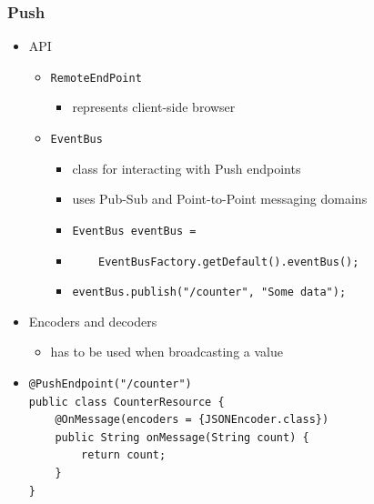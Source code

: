 \documentclass[10pt,xcolor=pdflatex]{beamer}
\begin{document}
\begin{frame}[containsverbatim]\frametitle{Push}
  \begin{itemize}
    \item API
      \begin{itemize}
        \item \texttt{RemoteEndPoint}
          \begin{itemize}
            \item represents client-side browser
          \end{itemize}
    	\item \texttt{EventBus}
          \begin{itemize}
            \item class for interacting with Push endpoints
	        \item uses Pub-Sub and Point-to-Point messaging domains
            \item[] {\footnotesize \verb;EventBus eventBus =;}
            \item[] {\footnotesize \verb+    EventBusFactory.getDefault().eventBus();+}
            \item[] \verb+eventBus.publish("/counter", "Some data");+
          \end{itemize}
      \end{itemize}
	\item Encoders and decoders
      \begin{itemize}
    	\item has to be used when broadcasting a value
      \end{itemize}
    \item[] \begin{footnotesize} \begin{verbatim}
@PushEndpoint("/counter")
public class CounterResource {
    @OnMessage(encoders = {JSONEncoder.class})
    public String onMessage(String count) {
        return count;
    }
}
\end{verbatim} \end{footnotesize}
  \end{itemize}
\end{frame}
\end{document}
